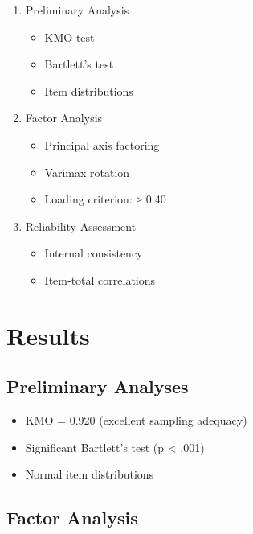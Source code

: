 \documentclass[
  english,
  man]{apa6}
\providecommand{\tightlist}{%
  \setlength{\itemsep}{0pt}\setlength{\parskip}{0pt}}
\begin{document}
\begin{enumerate}
\def\labelenumi{\arabic{enumi}.}
\tightlist
\item
  Preliminary Analysis

  \begin{itemize}
  \tightlist
  \item
    KMO test
  \item
    Bartlett's test
  \item
    Item distributions
  \end{itemize}
\item
  Factor Analysis

  \begin{itemize}
  \tightlist
  \item
    Principal axis factoring
  \item
    Varimax rotation
  \item
    Loading criterion: ≥ 0.40
  \end{itemize}
\item
  Reliability Assessment

  \begin{itemize}
  \tightlist
  \item
    Internal consistency
  \item
    Item-total correlations
  \end{itemize}
\end{enumerate}

\section{Results}\label{results}

\subsection{Preliminary Analyses}\label{preliminary-analyses}

\begin{itemize}
\tightlist
\item
  KMO = 0.920 (excellent sampling adequacy)
\item
  Significant Bartlett's test (p \textless{} .001)
\item
  Normal item distributions
\end{itemize}

\subsection{Factor Analysis}\label{factor-analysis}
\end{document}
